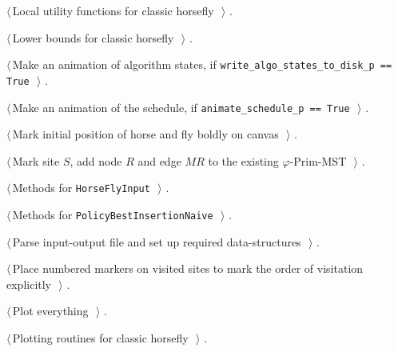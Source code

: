 \documentclass[11.5pt]{report}
\begin{document}
{\begin{list}{}{\setlength{\itemsep}{-\parsep}\setlength{\itemindent}{-\leftmargin}}
\item $\langle\,$Local utility functions for classic horsefly\nobreak\ {\footnotesize {}}$\,\rangle$ {\footnotesize {\NWtxtRefIn} .}
\item $\langle\,$Lower bounds for classic horsefly\nobreak\ {\footnotesize {}}$\,\rangle$ {\footnotesize {\NWtxtRefIn} .}
\item $\langle\,$Make an animation of algorithm states, if \verb|write_algo_states_to_disk_p == True|\nobreak\ {\footnotesize {}}$\,\rangle$ {\footnotesize {\NWtxtRefIn} .}
\item $\langle\,$Make an animation of the schedule, if \verb|animate_schedule_p == True|\nobreak\ {\footnotesize {}}$\,\rangle$ {\footnotesize {\NWtxtRefIn} .}
\item $\langle\,$Mark initial position of horse and fly boldly on canvas\nobreak\ {\footnotesize {}}$\,\rangle$ {\footnotesize {\NWtxtRefIn} .}
\item $\langle\,$Mark site $S$, add node $R$ and edge $MR$ to the existing $\varphi$-Prim-MST\nobreak\ {\footnotesize {}}$\,\rangle$ {\footnotesize {\NWtxtNoRef}.}
\item $\langle\,$Methods for \verb|HorseFlyInput|\nobreak\ {\footnotesize {}}$\,\rangle$ {\footnotesize {\NWtxtRefIn} .}
\item $\langle\,$Methods for \verb|PolicyBestInsertionNaive|\nobreak\ {\footnotesize {}}$\,\rangle$ {\footnotesize {\NWtxtRefIn} .}
\item $\langle\,$Parse input-output file and set up required data-structures\nobreak\ {\footnotesize {}}$\,\rangle$ {\footnotesize {\NWtxtRefIn} .}
\item $\langle\,$Place numbered markers on visited sites to mark the order of visitation explicitly\nobreak\ {\footnotesize {}}$\,\rangle$ {\footnotesize {\NWtxtRefIn} .}
\item $\langle\,$Plot everything\nobreak\ {\footnotesize {}}$\,\rangle$ {\footnotesize {\NWtxtRefIn} .}
\item $\langle\,$Plotting routines for classic horsefly\nobreak\ {\footnotesize {}}$\,\rangle$ {\footnotesize {\NWtxtRefIn} .}

\end{list}}
\end{document}
